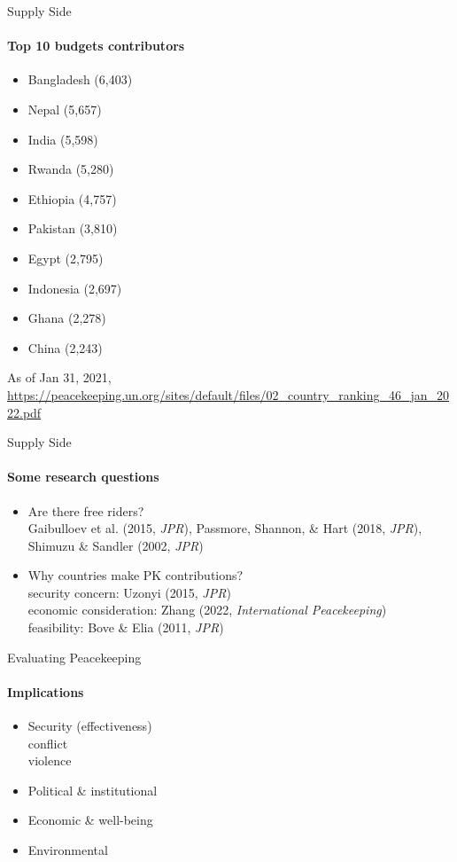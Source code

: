 \documentclass{beamer}
\begin{document}
\begin{frame}{Supply Side}
\framesubtitle{Top 10 budgets contributors}
\begin{itemize}
    \pause\item {} Bangladesh (6,403)
    \pause\item {} Nepal (5,657)
    \pause\item {} India (5,598)
    \pause\item {} Rwanda (5,280)
    \pause\item {} Ethiopia (4,757)
    \pause\item {} Pakistan (3,810)
    \pause\item {} Egypt (2,795)
    \pause\item {} Indonesia (2,697)
    \pause\item {} Ghana (2,278)
    \pause\item {} China (2,243)
\end{itemize}
\tiny As of Jan 31, 2021, \url{https://peacekeeping.un.org/sites/default/files/02_country_ranking_46_jan_2022.pdf}
\end{frame}

\begin{frame}{Supply Side}
\framesubtitle{Some research questions}
\begin{itemize}
    \pause\item Are there free riders?\\
    \pause      Gaibulloev et al. (2015, \textit{JPR}), Passmore, Shannon, \& Hart (2018, \textit{JPR}), Shimuzu \& Sandler (2002, \textit{JPR})
    \pause\item Why countries make PK contributions?\\
    \pause      security concern: Uzonyi (2015, \textit{JPR})\\
    \pause      economic consideration: Zhang (2022, \textit{International Peacekeeping})\\
    \pause      feasibility: Bove \& Elia (2011, \textit{JPR})
\end{itemize}
\end{frame}

\begin{frame}{Evaluating Peacekeeping}
\framesubtitle{Implications}
\begin{itemize}
    \pause\item Security (effectiveness)\\
    \pause      conflict\\
    \pause      violence
    \pause\item Political \& institutional
    \pause\item Economic \& well-being
    \pause\item Environmental
\end{itemize}  
\end{frame}
\end{document}
